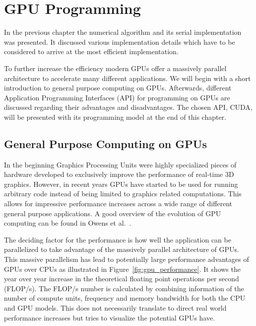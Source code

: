 \chapter{GPU Programming}
\label{cha:gpu_programming}

In the previous chapter the numerical algorithm and its serial implementation was presented. It discussed various implementation details which have to be considered to arrive at the most efficient implementation.

To further increase the efficiency modern GPUs offer a massively parallel architecture to accelerate many different applications. We will begin with a short introduction to general purpose computing on GPUs. Afterwards, different Application Programming Interfaces (API) for programming on GPUs are discussed regarding their advantages and disadvantages. The chosen API, CUDA, will be presented with its programming model at the end of this chapter.

\section{General Purpose Computing on GPUs}
In the beginning Graphics Processing Units were highly specialized pieces of hardware developed to exclusively improve the performance of real-time 3D graphics. However, in recent years GPUs have started to be used for running arbitrary code instead of being limited to graphics related computations. This allows for impressive performance increases across a wide range of different general purpose applications. A good overview of the evolution of GPU computing can be found in Owens et al.~\cite{Owens2008}.

The deciding factor for the performance is how well the application can be parallelized to take advantage of the massively parallel architecture of GPUs. This massive parallelism has lead to potentially large performance advantages of GPUs over CPUs as illustrated in Figure~\ref{fig:gpu_performance}. It shows the year over year increase in the theoretical floating point operations per second (FLOP/s). The FLOP/s number is calculated by combining information of the number of compute units, frequency and memory bandwidth for both the CPU and GPU models. This does not necessarily translate to direct real world performance increases but tries to visualize the potential GPUs have.

